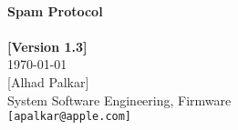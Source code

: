 
\begin{titlepage}

\setlength{\parindent}{0in}

{
	\fontsize{32}{32}\selectfont
	\textcolor{AppleGray}{\AppleLogo}
}
\\[0.25in]

{
	\fontsize{32}{32}\selectfont
	\textcolor{SmokeyDarkBlue}{\bfseries Spam Protocol} \\[0.3ex]
}
\\[0.25in]

\textbf{[Version 1.3]} \\
\today
\\[0.25in]

[Alhad Palkar] \\
System Software Engineering, Firmware \\
\texttt{[apalkar@apple.com]}

\vfill

\begin{center}
\end{center}

\end{titlepage}
